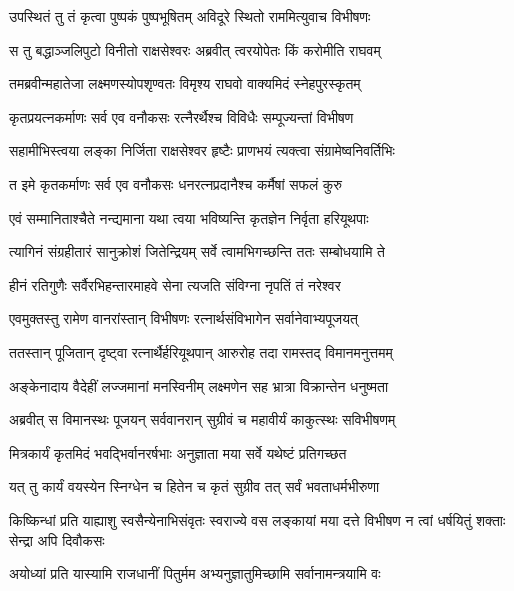
\twolineshloka
{उपस्थितं तु तं कृत्वा पुष्पकं पुष्पभूषितम्}
{अविदूरे स्थितो राममित्युवाच विभीषणः} %

\twolineshloka
{स तु बद्धाञ्जलिपुटो विनीतो राक्षसेश्वरः}
{अब्रवीत् त्वरयोपेतः किं करोमीति राघवम्} %

\twolineshloka
{तमब्रवीन्महातेजा लक्ष्मणस्योपशृण्वतः}
{विमृश्य राघवो वाक्यमिदं स्नेहपुरस्कृतम्} %

\twolineshloka
{कृतप्रयत्नकर्माणः सर्व एव वनौकसः}
{रत्नैरर्थैश्च विविधैः सम्पूज्यन्तां विभीषण} %

\twolineshloka
{सहामीभिस्त्वया लङ्का निर्जिता राक्षसेश्वर}
{हृष्टैः प्राणभयं त्यक्त्वा संग्रामेष्वनिवर्तिभिः} %

\twolineshloka
{त इमे कृतकर्माणः सर्व एव वनौकसः}
{धनरत्नप्रदानैश्च कर्मैषां सफलं कुरु} %

\twolineshloka
{एवं सम्मानिताश्चैते नन्द्यमाना यथा त्वया}
{भविष्यन्ति कृतज्ञेन निर्वृता हरियूथपाः} %

\twolineshloka
{त्यागिनं संग्रहीतारं सानुक्रोशं जितेन्द्रियम्}
{सर्वे त्वामभिगच्छन्ति ततः सम्बोधयामि ते} %

\twolineshloka
{हीनं रतिगुणैः सर्वैरभिहन्तारमाहवे}
{सेना त्यजति संविग्ना नृपतिं तं नरेश्वर} %

\twolineshloka
{एवमुक्तस्तु रामेण वानरांस्तान् विभीषणः}
{रत्नार्थसंविभागेन सर्वानेवाभ्यपूजयत्} %

\twolineshloka
{ततस्तान् पूजितान् दृष्ट्वा रत्नार्थैर्हरियूथपान्}
{आरुरोह तदा रामस्तद् विमानमनुत्तमम्} %

\twolineshloka
{अङ्केनादाय वैदेहीं लज्जमानां मनस्विनीम्}
{लक्ष्मणेन सह भ्रात्रा विक्रान्तेन धनुष्मता} %

\twolineshloka
{अब्रवीत् स विमानस्थः पूजयन् सर्ववानरान्}
{सुग्रीवं च महावीर्यं काकुत्स्थः सविभीषणम्} %

\twolineshloka
{मित्रकार्यं कृतमिदं भवद्भिर्वानरर्षभाः}
{अनुज्ञाता मया सर्वे यथेष्टं प्रतिगच्छत} %

\twolineshloka
{यत् तु कार्यं वयस्येन स्निग्धेन च हितेन च}
{कृतं सुग्रीव तत् सर्वं भवताधर्मभीरुणा} %

\threelineshloka
{किष्किन्धां प्रति याह्याशु स्वसैन्येनाभिसंवृतः}
{स्वराज्ये वस लङ्कायां मया दत्ते विभीषण}
{न त्वां धर्षयितुं शक्ताः सेन्द्रा अपि दिवौकसः} %

\twolineshloka
{अयोध्यां प्रति यास्यामि राजधानीं पितुर्मम}
{अभ्यनुज्ञातुमिच्छामि सर्वानामन्त्रयामि वः} %

